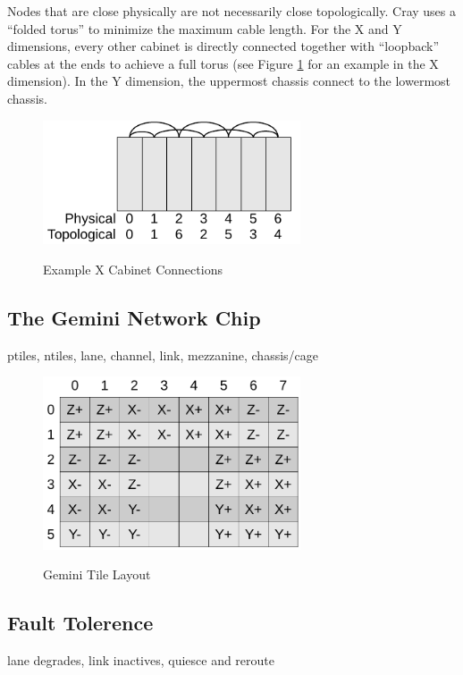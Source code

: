 \documentclass[10pt, conference, compsocconf]{IEEEtran}
\begin{document}
Nodes that are close physically are not necessarily close topologically.  Cray
uses a ``folded torus'' to minimize the maximum cable length.  For the X and Y
dimensions, every other cabinet is directly connected together with
``loopback'' cables at the ends to achieve a full torus (see Figure
\ref{fig:cabfold} for an example in the X dimension).  In the Y dimension, the
uppermost chassis connect to the lowermost chassis.

\begin{figure}
  \centering
  \includegraphics[width=3.0in]{figures/cabinets_folded.pdf}\\
  \caption{Example X Cabinet Connections}\label{fig:cabfold}
\end{figure}

\subsection{The Gemini Network Chip}
ptiles, ntiles, lane, channel, link, mezzanine, chassis/cage

\cite{hoti}

\begin{figure}
  \centering
  \includegraphics[width=3.0in]{figures/gemini_tiles.pdf}\\
  \caption{Gemini Tile Layout}\label{fig:tiles}
\end{figure}

\subsection{Fault Tolerence}
lane degrades, link inactives, quiesce and reroute
\end{document}
